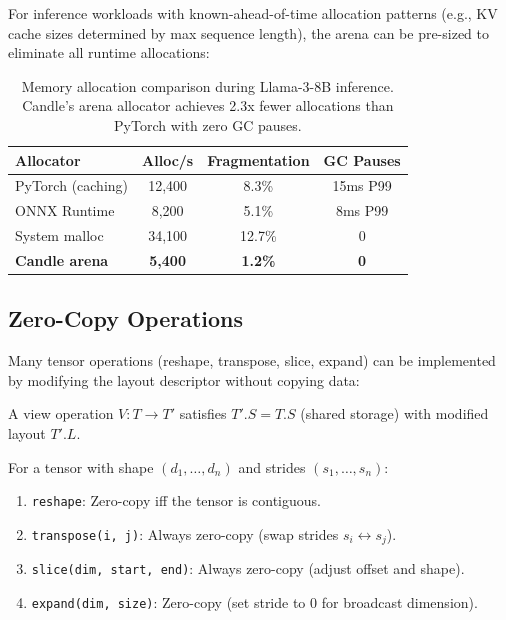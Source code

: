 For inference workloads with known-ahead-of-time allocation patterns (e.g., KV cache sizes determined by max sequence length), the arena can be pre-sized to eliminate all runtime allocations:

\begin{table}[H]
\centering
\small
\begin{tabular}{lccc}
\toprule
\textbf{Allocator} & \textbf{Alloc/s} & \textbf{Fragmentation} & \textbf{GC Pauses} \\
\midrule
PyTorch (caching) & 12,400 & 8.3\% & 15ms P99 \\
ONNX Runtime & 8,200 & 5.1\% & 8ms P99 \\
System malloc & 34,100 & 12.7\% & 0 \\
\textbf{Candle arena} & \textbf{5,400} & \textbf{1.2\%} & \textbf{0} \\
\bottomrule
\end{tabular}
\caption{Memory allocation comparison during Llama-3-8B inference. Candle's arena allocator achieves 2.3x fewer allocations than PyTorch with zero GC pauses.}
\label{tab:alloc}
\end{table}

\subsection{Zero-Copy Operations}

Many tensor operations (reshape, transpose, slice, expand) can be implemented by modifying the layout descriptor without copying data:

\begin{definition}
A view operation $V : T \to T'$ satisfies $T'.S = T.S$ (shared storage) with modified layout $T'.L$.
\end{definition}

\begin{proposition}
For a tensor with shape $(d_1, \ldots, d_n)$ and strides $(s_1, \ldots, s_n)$:
\begin{enumerate}[leftmargin=1.4em]
    \item \texttt{reshape}: Zero-copy iff the tensor is contiguous.
    \item \texttt{transpose(i, j)}: Always zero-copy (swap strides $s_i \leftrightarrow s_j$).
    \item \texttt{slice(dim, start, end)}: Always zero-copy (adjust offset and shape).
    \item \texttt{expand(dim, size)}: Zero-copy (set stride to 0 for broadcast dimension).
\end{enumerate}
\end{proposition}

